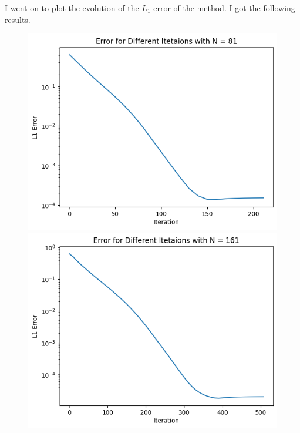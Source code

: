 \documentclass{article}
\begin{document}
I went on to plot the evolution of the $L_1$ error of the method. I got the following results.
\begin{figure}[H]
    \centering
    \begin{minipage}{.4\linewidth}
        \centering
        \includegraphics[width=\linewidth]{imgs/L1_81.png}
    \end{minipage}
    \begin{minipage}{.4\linewidth}
        \centering
        \includegraphics[width=\linewidth]{imgs/L1_161.png}
    \end{minipage}


\end{figure}
\end{document}
